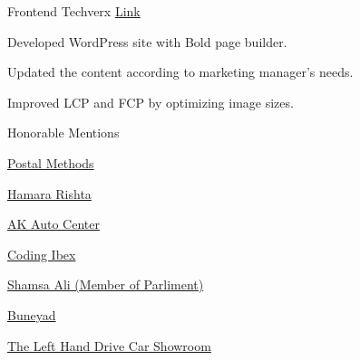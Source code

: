\begin{cventries}
\cventry
    {Frontend} %
    {Techverx} %
    {{\href{https://www.techverx.com/}{Link}}} %
    {} %
    {
      \begin{cvitems} %
        \item {Developed WordPress site with Bold page builder.}
        \item {Updated the content according to marketing manager's needs.}
        \item {Improved LCP and FCP by optimizing image sizes.}
      \end{cvitems}
    }

\cventry
    {} %
    {Honorable Mentions} %
    {} %
    {} %
    {
      \begin{cvitems} %
        \item {\textbf{}}
        \item {\href{https://www.postalmethods.com/}{Postal Methods}}
        \item {\href{https://www.hamararishta.pk/}{Hamara Rishta}}
        \item {\href{https://www.akautocenter.ae/}{AK Auto Center}}
        \item {\href{https://www.codingibex.com/}{Coding Ibex}}
        \item {\href{https://www.shamsaali.com/}{Shamsa Ali (Member of Parliment)}}
        \item {\href{https://www.buneyad.com/}{Buneyad}}
        \item {\href{https://www.lhdcarshowroom.co.uk/}{The Left Hand Drive Car Showroom}}
      \end{cvitems}
    }

\end{cventries}

